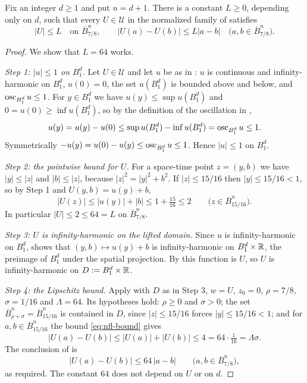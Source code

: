 \begin{lemma}
Fix an integer $d\ge1$ and put $n=d+1$. There is a constant $L\ge0$, depending
only on $d$, such that every $U\in\mathcal U$ in the normalized family of
 satisfies
\[
  |U|\le L\quad\text{on }\overline B_{7/8}^n,\qquad
  |U(a)-U(b)|\le L|a-b|\quad\bigl(a,b\in\overline B_{7/8}^n\bigr).
\]
\end{lemma}
\begin{proof}
We show that $L=64$ works.

\emph{Step 1: $|u|\le1$ on $B_1^d$.}
Let $U\in\mathcal U$ and let $u$ be as in : $u$ is
continuous and infinity-harmonic on $B_1^d$, $u(0)=0$, the set $u(B_1^d)$ is
bounded above and below, and $\operatorname{osc}_{B_1^d}u\le1$. For $y\in B_1^d$ we have
$u(y)\le\sup u(B_1^d)$ and $0=u(0)\ge\inf u(B_1^d)$, so by the definition of the
oscillation in ,
\[
  u(y)=u(y)-u(0)\le\sup u(B_1^d)-\inf u(B_1^d)=\operatorname{osc}_{B_1^d}u\le1 .
\]
Symmetrically $-u(y)=u(0)-u(y)\le\operatorname{osc}_{B_1^d}u\le1$. Hence $|u|\le1$ on
$B_1^d$.

\emph{Step 2: the pointwise bound for $U$.}
For a space-time point $z=(y,b)$ we have $|y|\le|z|$ and $|b|\le|z|$, because
$|z|^2=|y|^2+b^2$. If $|z|\le15/16$ then $|y|\le15/16<1$, so by Step 1 and
$U(y,b)=u(y)+b$,
\begin{equation}\label{eq:nfl-bound}
  |U(z)|\le|u(y)|+|b|\le1+\tfrac{15}{16}\le2
  \qquad\bigl(z\in\overline B_{15/16}^n\bigr).
\end{equation}
In particular $|U|\le2\le64=L$ on $\overline B_{7/8}^n$.

\emph{Step 3: $U$ is infinity-harmonic on the lifted domain.}
Since $u$ is infinity-harmonic on $B_1^d$,  shows that
$(y,b)\mapsto u(y)+b$ is infinity-harmonic on $B_1^d\times\mathbb{R}$, the preimage of
$B_1^d$ under the spatial projection. By  this
function is $U$, so $U$ is infinity-harmonic on $D:=B_1^d\times\mathbb{R}$.

\emph{Step 4: the Lipschitz bound.}
Apply  with $D$ as in Step 3, $w=U$,
$z_0=0$, $\rho=7/8$, $\sigma=1/16$ and $\Lambda=64$. Its hypotheses hold:
$\rho\ge0$ and $\sigma>0$; the set $\overline B_{\rho+\sigma}^n=\overline
B_{15/16}^n$ is contained in $D$, since $|z|\le15/16$ forces $|y|\le15/16<1$;
and for $a,b\in\overline B_{15/16}^n$ the bound \eqref{eq:nfl-bound} gives
\[
  |U(a)-U(b)|\le|U(a)|+|U(b)|\le4=64\cdot\tfrac1{16}=\Lambda\sigma .
\]
The conclusion of  is
\[
  |U(a)-U(b)|\le64\,|a-b|\qquad\bigl(a,b\in\overline B_{7/8}^n\bigr),
\]
as required. The constant $64$ does not depend on $U$ or on $d$.
\end{proof}
